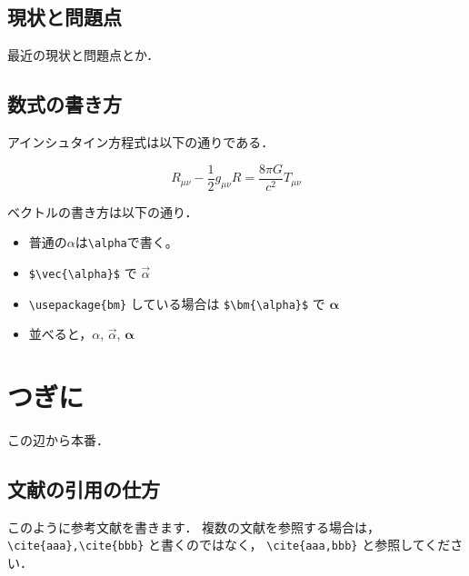 \documentclass[a4paper,11pt]{jreport} %
\begin{document}
\section{現状と問題点}
\label{sec:現状と問題点}

最近の現状と問題点とか．\par

\section{数式の書き方}
\label{sec:数式の書き方}

アインシュタイン方程式は以下の通りである．\par

\begin{equation}
  R_{\mu\nu} - \frac{1}{2} g_{\mu\nu} R = \frac{8\pi G}{c^2} T_{\mu\nu}
\end{equation}

ベクトルの書き方は以下の通り．\par

\begin{itemize}
  \item 普通の$\alpha$は\verb|\alpha|で書く。
  \item \verb|$\vec{\alpha}$| で $\vec{\alpha}$
  \item \verb|\usepackage{bm}| している場合は
        \verb|$\bm{\alpha}$| で $\bm{\alpha}$
  \item 並べると，$\alpha$, $\vec{\alpha}$, $\bm{\alpha}$
\end{itemize}

\chapter{つぎに}
\label{chap:つぎに}

この辺から本番．\par

\section{文献の引用の仕方}
\label{sec:分権の引用の仕方}

このように参考文献\cite{LaTexWiki,渡辺豊2016}を書きます．
複数の文献を参照する場合は， \verb|\cite{aaa},\cite{bbb}| と書くのではなく， \verb|\cite{aaa,bbb}| と参照してください．\par
\end{document}
